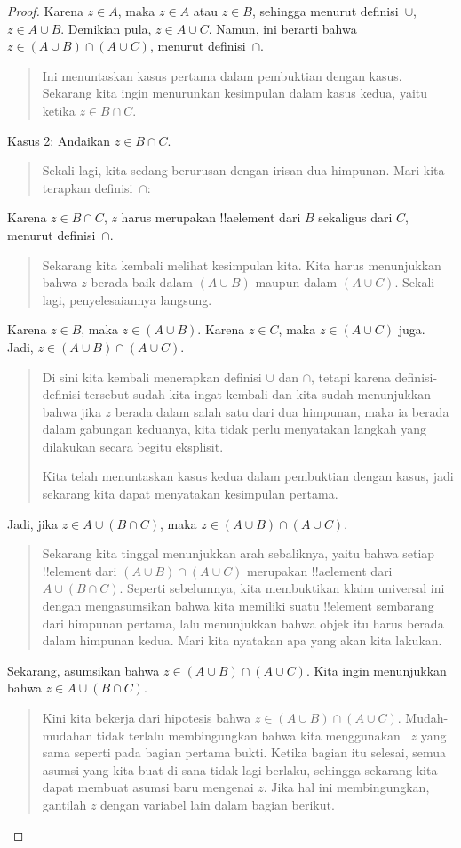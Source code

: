 \documentclass[../../../include/open-logic-section]{subfiles}
\begin{document}
\begin{proof}
Karena $z \in A$, maka $z \in A$ atau $z \in B$, sehingga menurut
definisi~$\cup$, $z \in A \cup B$. Demikian pula, $z \in A \cup C$.
Namun, ini berarti bahwa $z \in (A \cup B) \cap (A \cup C)$, menurut
definisi~$\cap$.
\begin{quote}
Ini menuntaskan kasus pertama dalam pembuktian dengan kasus. Sekarang
kita ingin menurunkan kesimpulan dalam kasus kedua, yaitu ketika $z
\in B \cap C$.
\end{quote}
Kasus 2: Andaikan $z \in B \cap C$.
\begin{quote}
Sekali lagi, kita sedang berurusan dengan irisan dua himpunan. Mari
kita terapkan definisi~$\cap$:
\end{quote}
Karena $z \in B \cap C$, $z$ harus merupakan !!a{element} dari $B$
sekaligus dari $C$, menurut definisi~$\cap$.
\begin{quote}
Sekarang kita kembali melihat kesimpulan kita. Kita harus menunjukkan
bahwa $z$ berada baik dalam $(A \cup B)$ maupun dalam $(A \cup C)$.
Sekali lagi, penyelesaiannya langsung.
\end{quote}
Karena $z \in B$, maka $z \in (A \cup B)$. Karena $z \in C$, maka $z
\in (A \cup C)$ juga. Jadi, $z \in (A \cup B) \cap (A \cup C)$.
\begin{quote}
Di sini kita kembali menerapkan definisi $\cup$ dan $\cap$, tetapi
karena definisi-definisi tersebut sudah kita ingat kembali dan kita
sudah menunjukkan bahwa jika $z$ berada dalam salah satu dari dua
himpunan, maka ia berada dalam gabungan keduanya, kita tidak perlu
menyatakan langkah yang dilakukan secara begitu eksplisit.

Kita telah menuntaskan kasus kedua dalam pembuktian dengan kasus, jadi
sekarang kita dapat menyatakan kesimpulan pertama.
\end{quote}
Jadi, jika $z \in A \cup (B \cap C)$, maka $z \in (A \cup B) \cap (A
\cup C)$.
\begin{quote}
Sekarang kita tinggal menunjukkan arah sebaliknya, yaitu bahwa setiap
!!{element} dari $(A \cup B) \cap (A \cup C)$ merupakan !!a{element}
dari $A \cup (B \cap C)$. Seperti sebelumnya, kita membuktikan klaim
universal ini dengan mengasumsikan bahwa kita memiliki suatu
!!{element} sembarang dari himpunan pertama, lalu menunjukkan bahwa
objek itu harus berada dalam himpunan kedua. Mari kita nyatakan apa
yang akan kita lakukan.
\end{quote}
Sekarang, asumsikan bahwa $z \in (A \cup B) \cap (A \cup C)$. Kita
ingin menunjukkan bahwa $z \in A \cup (B \cap C)$.
\begin{quote}
Kini kita bekerja dari hipotesis bahwa $z \in (A \cup B) \cap (A \cup
C)$. Mudah-mudahan tidak terlalu membingungkan bahwa kita menggunakan
~$z$ yang sama seperti pada bagian pertama bukti. Ketika bagian itu
selesai, semua asumsi yang kita buat di sana tidak lagi berlaku,
sehingga sekarang kita dapat membuat asumsi baru mengenai $z$. Jika
hal ini membingungkan, gantilah $z$ dengan variabel lain dalam bagian
berikut.


\end{quote}
\end{proof}
\end{document}
